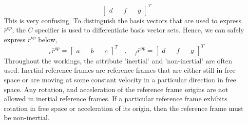 \documentclass[a4paper, 12pt]{report}
\begin{document}
\begin{center}
$$\begin{bmatrix}
d && f && g
\end{bmatrix}^{T}$$
This is very confusing. To distinguish the basis vectors that are used to express $\bar{r}^{op}$, the $C$ specifier is used to differentiate basis vector sets. Hence, we can safely express $\bar{r}^{op}$ below,
$${}^{}_{e}\bar{r}^{op} = \begin{bmatrix}
a && b && c
\end{bmatrix}^{T} \quad,\quad {}^{}_{f}\bar{r}^{op} = \begin{bmatrix}
d && f && g
\end{bmatrix}^{T}$$
Throughout the workings, the attribute 'inertial' and 'non-inertial' are often used. Inertial reference frames are reference frames that are either still in free space or are moving at some constant velocity in a particular direction in free space. Any rotation, and acceleration of the reference frame origins are not allowed in inertial reference frames. If a particular reference frame exhibits rotation in free space or acceleration of its origin, then the reference frame must be non-inertial.

\end{center}
\end{document}
